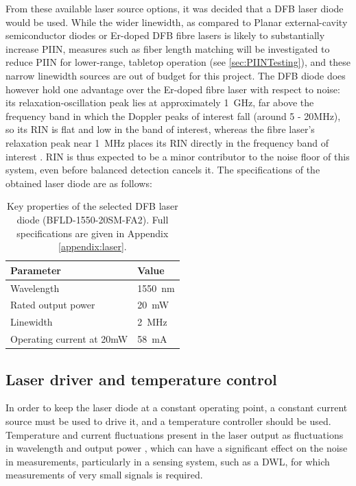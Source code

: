 From these available laser source options, it was decided that a DFB laser diode would be used. While the wider linewidth, as compared to Planar external-cavity semiconductor diodes or Er-doped DFB fibre lasers is likely to substantially increase PIIN, measures such as fiber length matching will be investigated to reduce PIIN for lower-range, tabletop operation (see \autoref{sec:PIINTesting}), and these narrow linewidth sources are out of budget for this project. The DFB diode does however hold one advantage over the Er-doped fibre laser with respect to noise: its relaxation-oscillation peak lies at approximately \SI{1}{\giga\hertz}, far above the frequency band in which the Doppler peaks of interest fall (around 5 - 20MHz), so its RIN is flat and low in the band of interest, whereas the fibre laser's relaxation peak near \SI{1}{\mega\hertz} places its RIN directly in the frequency band of interest \cite{cariou2006laser}. RIN is thus expected to be a minor contributor to the noise floor of this system, even before balanced detection cancels it. The specifications of the obtained laser diode are as follows:
\begin{table}[H]
	\centering
	
	\begin{tabular}{@{}ll@{}}
		\toprule
		\textbf{Parameter} & \textbf{Value} \\
		\midrule
		Wavelength                  & 1550~nm \\
		Rated output power          & 20~mW \\
		Linewidth                   & 2~MHz \\
		Operating current at 20mW & 58~mA \\
		\bottomrule
	\end{tabular}
	\caption{Key properties of the selected DFB laser diode
		(BFLD-1550-20SM-FA2). Full specifications are given in Appendix
		\ref{appendix:laser}.}
		\label{tab:dfb-laser}
\end{table}



\subsection{Laser driver and temperature control}
In order to keep the laser diode at a constant operating point, a constant current source must be used to drive it, and a temperature controller should be used. Temperature and current fluctuations present in the laser output as fluctuations in wavelength and output power \cite{gwinner2024}, which can have a significant effect on the noise in measurements, particularly in a sensing system, such as a DWL, for which measurements of very small signals is required.


